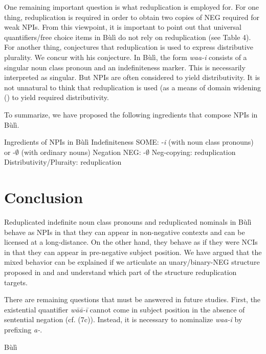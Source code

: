 \documentclass[output=paper,colorlinks,citecolor=brown]{langscibook}
\begin{document}
One remaining important question is what reduplication is employed for.  For one thing, reduplication is required in order to obtain two copies of NEG required for weak NPIs. From this viewpoint, it is important to point out that universal quantifiers/free choice items in Bùlì do not rely on reduplication (see Table 4). For another thing, \cite{Haspelmath1997} conjectures that reduplication is used to express distributive plurality. We concur with his conjecture. In Bùlì, the form \textit{waa-i} consists of a singular noun class pronoun and an indefiniteness marker. This is necessarily interpreted as singular. But NPIs are often considered to yield distributivity. It is not unnatural to think that reduplication is used (as a means of domain widening (\citealt{KadmonLandman1993}) to yield required distributivity.

To summarize, we have proposed the following ingredients that compose NPIs in Bùlì.

\ea Ingredients of NPIs in Bùlì
\ea Indefiniteness SOME: -\textit{i} (with noun class pronouns) or -$\emptyset$ (with ordinary nouns)
\ex Negation NEG: -$\emptyset$
\ex Neg-copying: reduplication
\ex Distributivity/Pluraity: reduplication
\z
\z

\section{Conclusion}

Reduplicated indefinite noun class pronouns and reduplicated nominals in Bùlì behave as NPIs in that they can appear in non-negative contexts and can be licensed at a long-distance. On the other hand, they behave as if they were NCIs in that they can appear in pre-negative subject position. We have argued that the mixed behavior can be explained if we articulate an unary/binary-NEG structure proposed in \cite{CollinsPostal2014} and \cite{CollinsEtAl2017} and understand which part of the structure reduplication targets.

There are remaining questions that must be answered in future studies. First, the existential quantifier \textit{wāā-ī} cannot come in subject position in the absence of sentential negation (cf. (7c)). Instead, it is necessary to nominalize \textit{waa-i} by prefixing \textit{a-}.

\ea Bùlì\\
\ea[]{
\gll Wāā-ī *(àn) ch\v{e}ng Wīāgā. \\
\textsc{nc}-i \textsc{neg} go Wiaga \\
\glt `Someone didn't go to Wiaga/No one went to Wiaga.'}
\z
\z
\end{document}
